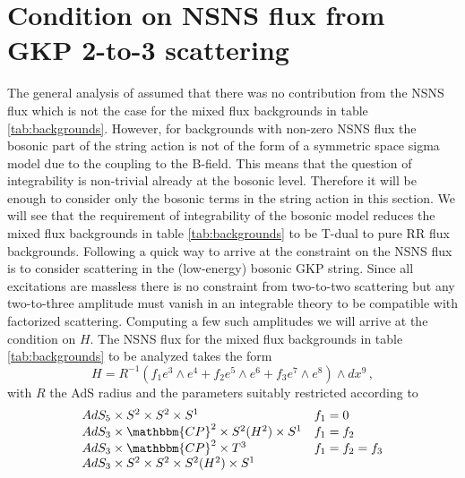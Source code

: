 \documentclass[a4paper,11pt]{article}
\begin{document}
\section{Condition on NSNS flux from GKP 2-to-3 scattering}
The general analysis of \cite{Wulff:2017lxh} assumed that there was no contribution from the NSNS flux which is not the case for the mixed flux backgrounds in table \ref{tab:backgrounds}. However, for backgrounds with non-zero NSNS flux the bosonic part of the string action is not of the form of a symmetric space sigma model due to the coupling to the B-field. This means that the question of integrability is non-trivial already at the bosonic level. Therefore it will be enough to consider only the bosonic terms in the string action in this section. We will see that the requirement of integrability of the bosonic model reduces the mixed flux backgrounds in table \ref{tab:backgrounds} to be T-dual to pure RR flux backgrounds. Following \cite{Wulff:2017hzy} a quick way to arrive at the constraint on the NSNS flux is to consider scattering in the (low-energy) bosonic GKP string. Since all excitations are massless there is no constraint from two-to-two scattering but any two-to-three amplitude must vanish in an integrable theory to be compatible with factorized scattering. Computing a few such amplitudes we will arrive at the condition on $H$. The NSNS flux for the mixed flux backgrounds in table \ref{tab:backgrounds} to be analyzed takes the form
\begin{equation}
H=R^{-1}(f_1e^3\wedge e^4+f_2e^5\wedge e^6+f_3e^7\wedge e^8)\wedge dx^9\,,
\label{eq:H}
\end{equation}
with $R$ the AdS radius and the parameters suitably restricted according to
\begin{equation}
\begin{array}{ll}
AdS_5\times S^2\times S^2\times S^1 & f_1=0\\
AdS_3\times\mathbbm{CP}^2\times S^2(H^2)\times S^1 & f_1=f_2\\
AdS_3\times\mathbbm{CP}^2\times T^3 & f_1=f_2=f_3\\
AdS_3\times S^2\times S^2\times S^2(H^2)\times S^1 & \\
\end{array}
\end{equation}
\end{document}
